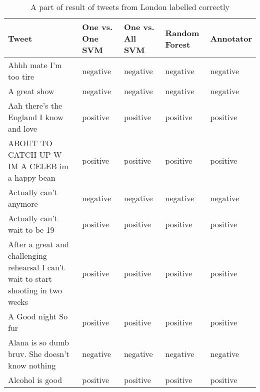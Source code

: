 \begin{table}[ht]
	\caption{A part of result of tweets from London labelled correctly}
	\begin{tabular}{|p{5cm}|p{1.8cm}|p{1.8cm}|p{1.8cm}|p{1.8cm}|} \hline
	Tweet & One vs. One SVM &One vs. All SVM &Random Forest & Annotator\\ \hline
	Ahhh mate I'm too tire & negative & negative & negative & negative \\ \hline
	A great show & negative & negative & negative & negative \\ \hline
	 Aah there's the England I know and love  & positive& positive& positive& positive \\ \hline
	ABOUT TO CATCH UP W IM A CELEB im a happy bean & positive & positive & positive& positive \\ \hline
	Actually can't anymore  & negative& negative& negative& negative \\ \hline

	Actually can't wait to be 19 & positive& positive& positive& positive \\ \hline
	After a great and challenging rehearsal I can't wait to start shooting in two weeks & positive & positive & positive &positive \\ \hline
	A Good night So fur & positive& positive& positive& positive \\ \hline
	Alana is so dumb bruv. She doesn't know nothing & negative & negative& negative& negative\\ \hline
	Alcohol is good & positive& positive& positive& positive\\ \hline



	\end{tabular}
	\label{tab:correct_tweets_en}
\end{table}


